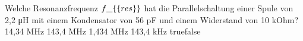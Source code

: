     {Welche Resonanzfrequenz $f\_\{\textrm\{res\}\}$ hat die Parallelschaltung einer Spule von 2,2 μH mit einem Kondensator von 56 pF und einem Widerstand von 10 kOhm?}
    {14,34 MHz}
    {143,4 MHz}
    {1,434 MHz}
    {143,4 kHz}
    {true}{false}